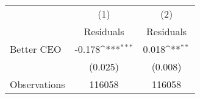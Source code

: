 {
\def\sym#1{\ifmmode^{#1}\else\(^{#1}\)\fi}
\begin{tabular}{l*{2}{c}}
\hline\hline
                    &\multicolumn{1}{c}{(1)}&\multicolumn{1}{c}{(2)}\\
                    &\multicolumn{1}{c}{Residuals}&\multicolumn{1}{c}{Residuals}\\
\hline
Better CEO          &      -0.178\sym{***}&       0.018\sym{**} \\
                    &     (0.025)         &     (0.008)         \\
\hline
Observations        &      116058         &      116058         \\
\hline\hline
\end{tabular}
}

